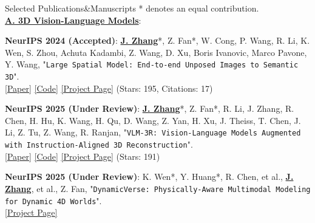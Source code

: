 \documentclass{resume} %
\begin{document}
\vspace{-1mm}

\begin{rSection}{Selected Publications\&Manuscripts}
\vspace{-1mm}
\small{* denotes an equal contribution.} \\
\textbf{\underline{A. 3D Vision-Language Models}}:

{ {\bf NeurIPS 2024  (Accepted)}}:
\underline{\textbf{J. Zhang}}*, Z. Fan*, W. Cong, P. Wang, R. Li, K. Wen, S. Zhou, Achuta Kadambi, Z. Wang, D. Xu, Boris Ivanovic, Marco Pavone, Y. Wang,
 "{\texttt{Large Spatial Model: End-to-end Unposed Images to Semantic 3D}}".
\\ \hspace{1em} {\color{BlueViolet} \href{https://arxiv.org/abs/2410.18956}{[\underline{Paper}]} \hspace{1em} \href{https://github.com/NVlabs/LSM}{[\underline{Code}]} \hspace{1em} \href{https://largespatialmodel.github.io/}{[\underline{Project Page}]}} \hspace{1em} (Stars: 195, Citations: 17)
\vspace{-1mm}

{ {\bf NeurIPS 2025 (Under Review)}}:
\underline{\textbf{J. Zhang}}*, Z. Fan*, R. Li, J. Zhang, R. Chen, H. Hu, K. Wang, H. Qu, D. Wang, Z. Yan, H. Xu, J. Theiss, T. Chen, J. Li, Z. Tu, Z. Wang, R. Ranjan, "{\texttt{VLM-3R: Vision-Language Models Augmented with Instruction-Aligned 3D Reconstruction}}".
\\ \hspace{1em} {\color{BlueViolet} \href{https://arxiv.org/abs/2505.20279}{[\underline{Paper}]} \hspace{1em} \href{https://github.com/VITA-Group/VLM-3R}{[\underline{Code}]} \hspace{1em} \href{https://vlm-3r.github.io/}{[\underline{Project Page}]}} \hspace{1em} (Stars: 191)
\vspace{-1mm}

{ {\bf NeurIPS 2025 (Under Review)}}:
K. Wen*, Y. Huang*, R. Chen, et al., \underline{\textbf{J. Zhang}}, et al., Z. Fan, "{\texttt{DynamicVerse: Physically-Aware Multimodal Modeling for Dynamic 4D Worlds}}".
\\ \hspace{1em} {\color{BlueViolet} \href{https://dynamic-verse.github.io/}{[\underline{Project Page}]}}
\vspace{-1mm}


\end{rSection}
\end{document}
